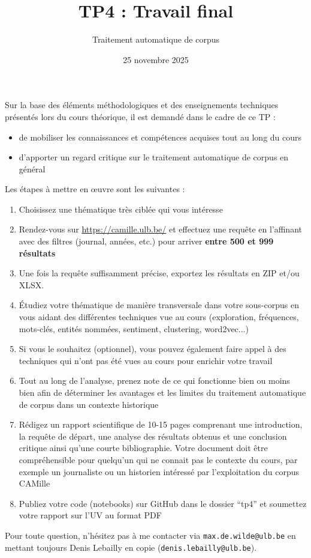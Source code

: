 \documentclass[a4paper,11pt]{article}
\title{TP4 : Travail final}
\author{Traitement automatique de corpus}
\date{25 novembre 2025}
\begin{document}
\maketitle
\thispagestyle{empty}

Sur la base des éléments méthodologiques et des enseignements techniques présentés lors du cours théorique, il est demandé dans le cadre de ce TP :

\begin{itemize}
\item de mobiliser les connaissances et compétences acquises tout au long du cours
\item d'apporter un regard critique sur le traitement automatique de corpus en général
\end{itemize}

\vspace{0.7cm}

Les étapes à mettre en \oe uvre sont les suivantes :

\begin{enumerate}
\item Choisissez une thématique très ciblée qui vous intéresse
\item Rendez-vous sur \url{https://camille.ulb.be/} et effectuez une requête en l'affinant avec des filtres (journal, années, etc.) pour arriver \textbf{entre 500 et 999 résultats}
\item Une fois la requête suffisamment précise, exportez les résultats en ZIP et/ou XLSX.
\item Étudiez votre thématique de manière transversale dans votre sous-corpus en vous aidant des différentes techniques vue au cours (exploration, fréquences, mots-clés, entités nommées, sentiment, clustering, word2vec...)
\item Si vous le souhaitez (optionnel), vous pouvez également faire appel à des techniques qui n'ont pas été vues au cours pour enrichir votre travail
\item Tout au long de l'analyse, prenez note de ce qui fonctionne bien ou moins bien afin de déterminer les avantages et les limites du traitement automatique de corpus dans un contexte historique
\item Rédigez un rapport scientifique de 10-15 pages comprenant une introduction, la requête de départ, une analyse des résultats obtenus et une conclusion critique ainsi qu'une courte bibliographie. Votre document doit être compréhensible pour quelqu'un qui ne connait pas le contexte du cours, par exemple un journaliste ou un historien intéressé par l'exploitation du corpus CAMille
\item Publiez votre code (notebooks) sur GitHub dans le dossier \enquote{tp4} et soumettez votre rapport sur l'UV au format PDF

\end{enumerate}

Pour toute question, n'hésitez pas à me contacter via \texttt{max.de.wilde@ulb.be} en mettant toujours Denis Lebailly en copie (\texttt{denis.lebailly@ulb.be}).
\end{document}
